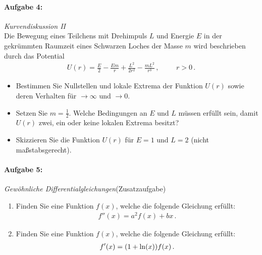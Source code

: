 \paragraph{Aufgabe 4: } \emph{Kurvendiskussion II}\\[0.2cm]
Die Bewegung eines Teilchens mit Drehimpuls $L$ und Energie $E$ in der gekrümmten Raumzeit eines Schwarzen Loches der Masse $m$ wird beschrieben durch das Potential
\begin{align*}
U(r)=\frac{E}{2}-\frac{Em}{r}+\frac{L^2}{2r^2}-\frac{mL^2}{r^3}\,, \hspace{1cm} r>0\,.
\end{align*}
\begin{itemize}
\item Bestimmen Sie Nullstellen und lokale Extrema der Funktion $U(r)$ sowie deren Verhalten für $\to\infty$ und $\to 0$.
\item Setzen Sie $\textstyle m=\frac{1}{2}$. Welche Bedingungen an $E$ und $L$ müssen erfüllt sein, damit $U(r)$ zwei, ein oder keine lokalen Extrema besitzt?
\item Skizzieren Sie die Funktion $U(r)$ für $E=1$ und $L=2$ (nicht maßstabsgerecht).
\end{itemize} 
%
\paragraph{Aufgabe 5: } \emph{Gewöhnliche Differentialgleichungen}\hfill (Zusatzaufgabe)\\[0.2cm]
\begin{enumerate}[label=(\alph*)]
\item Finden Sie eine Funktion $f(x)$, welche die folgende Gleichung erfüllt:
\begin{align*}
f''(x)=a^2f(x)+bx\,.
\end{align*}
\item Finden Sie eine Funktion $f(x)$, welche die folgende Gleichung erfüllt:
\begin{align*}
f'(x)=\qty(1+\ln(x))f(x)\,.
\end{align*}
\end{enumerate}